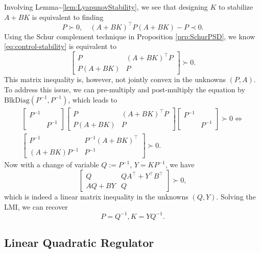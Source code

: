 \documentclass[
]{book}
\theoremstyle{definition}
\theoremstyle{definition}
\theoremstyle{definition}
\theoremstyle{definition}
\theoremstyle{remark}
\begin{document}
Involving Lemma\textasciitilde\ref{lem:LyapunovStability}, we see that designing \(K\) to stabilize \(A + BK\) is equivalent to finding
\begin{equation}
P \succ 0, \quad (A + BK)^\top P (A + BK) - P \prec 0.
\label{eq:control-stability}
\end{equation}
Using the Schur complement technique in Proposition \ref{prp:SchurPSD}, we know \eqref{eq:control-stability} is equivalent to
\[
\begin{bmatrix}
P & (A + BK)^\top P \\
P(A+BK) & P \end{bmatrix} \succ 0.
\]
This matrix inequality is, however, not jointly convex in the unknowns \((P,A)\). To address this issue, we can pre-multiply and post-multiply the equation by \(\mathrm{BlkDiag}(P^{-1}, P^{-1})\), which leads to
\begin{equation}
\begin{split}
\begin{bmatrix} P^{-1}& \\
& P^{-1}\end{bmatrix}
\begin{bmatrix}
P & (A + BK)^\top P \\
P(A+BK) & P \end{bmatrix}
\begin{bmatrix} P^{-1}& \\
& P^{-1}\end{bmatrix} \succ 0  \Leftrightarrow \\
\begin{bmatrix} P^{-1}& P^{-1}(A + BK)^\top\\ (A+BK)P^{-1}& P^{-1}\end{bmatrix} \succ 0.
\end{split}
\end{equation}
Now with a change of variable \(Q:= P^{-1}\), \(Y = K P^{-1}\), we have
\[
\begin{bmatrix} Q & Q A^\top+ Y^\top B^\top\\
A Q + BY & Q \end{bmatrix} \succ 0,
\]
which is indeed a linear matrix inequality in the unknowns \((Q,Y)\). Solving the LMI, we can recover
\[
P = Q^{-1}, K = Y Q^{-1}.
\]

\subsection{Linear Quadratic Regulator}\label{linear-quadratic-regulator}
\end{document}
